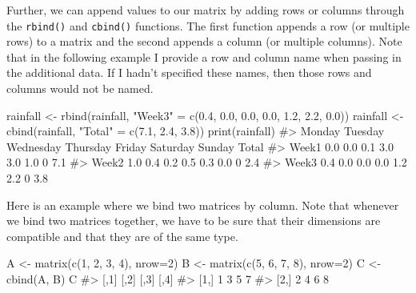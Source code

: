 \documentclass[
  letterpaper,
]{latex/krantz}
\makeatletter
\newenvironment{Shaded}{\begin{snugshade}}{\end{snugshade}}
\newcommand{\AttributeTok}[1]{\textcolor[rgb]{0.40,0.45,0.13}{#1}}
\newcommand{\CommentTok}[1]{\textcolor[rgb]{0.37,0.37,0.37}{#1}}
\newcommand{\DecValTok}[1]{\textcolor[rgb]{0.68,0.00,0.00}{#1}}
\newcommand{\FloatTok}[1]{\textcolor[rgb]{0.68,0.00,0.00}{#1}}
\newcommand{\FunctionTok}[1]{\textcolor[rgb]{0.28,0.35,0.67}{#1}}
\newcommand{\NormalTok}[1]{\textcolor[rgb]{0.00,0.23,0.31}{#1}}
\newcommand{\OtherTok}[1]{\textcolor[rgb]{0.00,0.23,0.31}{#1}}
\newcommand{\StringTok}[1]{\textcolor[rgb]{0.13,0.47,0.30}{#1}}
\newenvironment{kframe}{%
\medskip{}
\setlength{\fboxsep}{.8em}
 \def\at@end@of@kframe{}%
 \ifinner\ifhmode%
  \def\at@end@of@kframe{\end{minipage}}%
  \begin{minipage}{\columnwidth}%
 \fi\fi%
 \def\FrameCommand##1{\hskip\@totalleftmargin \hskip-\fboxsep
 \colorbox{shadecolor}{##1}\hskip-\fboxsep
     \hskip-\linewidth \hskip-\@totalleftmargin \hskip\columnwidth}%
 \MakeFramed {\advance\hsize-\width
   \@totalleftmargin\z@ \linewidth\hsize
   \@setminipage}}%
 {\par\unskip\endMakeFramed%
 \at@end@of@kframe}
\renewenvironment{Shaded}{\begin{kframe}}{\end{kframe}}
\makeatother
\begin{document}
Further, we can append values to our matrix by adding rows or columns
through the \texttt{rbind()}
and \texttt{cbind()}
functions. The first function appends a row (or multiple rows) to a
matrix and the second appends a column (or multiple columns). Note that
in the following example I provide a row and column name when passing in
the additional data. If I hadn't specified these names, then those rows
and columns would not be named.

\begin{Shaded}
\begin{Highlighting}[]
\NormalTok{rainfall }\OtherTok{\textless{}{-}} \FunctionTok{rbind}\NormalTok{(rainfall, }\StringTok{"Week3"} \OtherTok{=} \FunctionTok{c}\NormalTok{(}\FloatTok{0.4}\NormalTok{, }\FloatTok{0.0}\NormalTok{, }\FloatTok{0.0}\NormalTok{, }\FloatTok{0.0}\NormalTok{, }\FloatTok{1.2}\NormalTok{, }\FloatTok{2.2}\NormalTok{, }
                                        \FloatTok{0.0}\NormalTok{))}
\NormalTok{rainfall }\OtherTok{\textless{}{-}} \FunctionTok{cbind}\NormalTok{(rainfall, }\StringTok{"Total"} \OtherTok{=} \FunctionTok{c}\NormalTok{(}\FloatTok{7.1}\NormalTok{, }\FloatTok{2.4}\NormalTok{, }\FloatTok{3.8}\NormalTok{))}
\FunctionTok{print}\NormalTok{(rainfall)}
\CommentTok{\#\textgreater{}       Monday Tuesday Wednesday Thursday Friday Saturday Sunday Total}
\CommentTok{\#\textgreater{} Week1    0.0     0.0       0.1      3.0    3.0      1.0      0   7.1}
\CommentTok{\#\textgreater{} Week2    1.0     0.4       0.2      0.5    0.3      0.0      0   2.4}
\CommentTok{\#\textgreater{} Week3    0.4     0.0       0.0      0.0    1.2      2.2      0   3.8}
\end{Highlighting}
\end{Shaded}

Here is an example where we bind two matrices by column. Note that
whenever we bind two matrices together, we have to be sure that their
dimensions are compatible and that they are of the same type.

\begin{Shaded}
\begin{Highlighting}[]
\NormalTok{A }\OtherTok{\textless{}{-}} \FunctionTok{matrix}\NormalTok{(}\FunctionTok{c}\NormalTok{(}\DecValTok{1}\NormalTok{, }\DecValTok{2}\NormalTok{, }\DecValTok{3}\NormalTok{, }\DecValTok{4}\NormalTok{), }\AttributeTok{nrow=}\DecValTok{2}\NormalTok{)}
\NormalTok{B }\OtherTok{\textless{}{-}} \FunctionTok{matrix}\NormalTok{(}\FunctionTok{c}\NormalTok{(}\DecValTok{5}\NormalTok{, }\DecValTok{6}\NormalTok{, }\DecValTok{7}\NormalTok{, }\DecValTok{8}\NormalTok{), }\AttributeTok{nrow=}\DecValTok{2}\NormalTok{)}
\NormalTok{C }\OtherTok{\textless{}{-}} \FunctionTok{cbind}\NormalTok{(A, B)}
\NormalTok{C}
\CommentTok{\#\textgreater{}      [,1] [,2] [,3] [,4]}
\CommentTok{\#\textgreater{} [1,]    1    3    5    7}
\CommentTok{\#\textgreater{} [2,]    2    4    6    8}
\end{Highlighting}
\end{Shaded}
\end{document}
